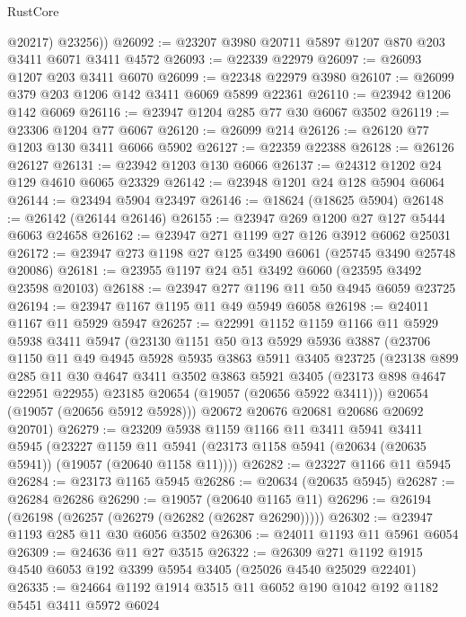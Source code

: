 \begin{lexlean}{RustCore}
\begin{coremodule}
          @20217)
        @23256))
@26092 := @23207 @3980 @20711 @5897 @1207 @870 @203 @3411 @6071 @3411 @4572
@26093 := @22339 @22979
@26097 := @26093 @1207 @203 @3411 @6070
@26099 := @22348 @22979 @3980
@26107 := @26099 @379 @203 @1206 @142 @3411 @6069 @5899 @22361
@26110 := @23942 @1206 @142 @6069
@26116 := @23947 @1204 @285 @77 @30 @6067 @3502
@26119 := @23306 @1204 @77 @6067
@26120 := @26099 @214
@26126 := @26120 @77 @1203 @130 @3411 @6066 @5902
@26127 := @22359 @22388
@26128 := @26126 @26127
@26131 := @23942 @1203 @130 @6066
@26137 := @24312 @1202 @24 @129 @4610 @6065 @23329
@26142 := @23948 @1201 @24 @128 @5904 @6064
@26144 := @23494 @5904 @23497
@26146 := @18624 (@18625 @5904)
@26148 := @26142 (@26144 @26146)
@26155 := @23947 @269 @1200 @27 @127 @5444 @6063 @24658
@26162 := @23947 @271 @1199 @27 @126 @3912 @6062 @25031
@26172 := @23947 @273 @1198 @27 @125 @3490 @6061 (@25745 @3490 @25748 @20086)
@26181 := @23955 @1197 @24 @51 @3492 @6060 (@23595 @3492 @23598 @20103)
@26188 := @23947 @277 @1196 @11 @50 @4945 @6059 @23725
@26194 := @23947 @1167 @1195 @11 @49 @5949 @6058
@26198 := @24011 @1167 @11 @5929 @5947
@26257 := @22991
    @1152
    @1159
    @1166
    @11
    @5929
    @5938
    @3411
    @5947
    (@23130
      @1151
      @50
      @13
      @5929
      @5936
      @3887
      (@23706
        @1150
        @11
        @49
        @4945
        @5928
        @5935
        @3863
        @5911
        @3405
        @23725
        (@23138
          @899
          @285
          @11
          @30
          @4647
          @3411
          @3502
          @3863
          @5921
          @3405
          (@23173 @898 @4647 @22951 @22955)
          @23185
          @20654
          (@19057 (@20656 @5922 @3411)))
        @20654
        (@19057 (@20656 @5912 @5928)))
      @20672
      @20676
      @20681
      @20686
      @20692
      @20701)
@26279 := @23209
    @5938
    @1159
    @1166
    @11
    @3411
    @5941
    @3411
    @5945
    (@23227
      @1159
      @11
      @5941
      (@23173 @1158 @5941 (@20634 (@20635 @5941)) (@19057 (@20640 @1158 @11))))
@26282 := @23227 @1166 @11 @5945
@26284 := @23173 @1165 @5945
@26286 := @20634 (@20635 @5945)
@26287 := @26284 @26286
@26290 := @19057 (@20640 @1165 @11)
@26296 := @26194 (@26198 (@26257 (@26279 (@26282 (@26287 @26290)))))
@26302 := @23947 @1193 @285 @11 @30 @6056 @3502
@26306 := @24011 @1193 @11 @5961 @6054
@26309 := @24636 @11 @27 @3515
@26322 := @26309 @271 @1192 @1915 @4540 @6053 @192 @3399 @5954 @3405 (@25026 @4540 @25029 @22401)
@26335 := @24664 @1192 @1914 @3515 @11 @6052 @190 @1042 @192 @1182 @5451 @3411 @5972 @6024

\end{coremodule}
\end{lexlean}
